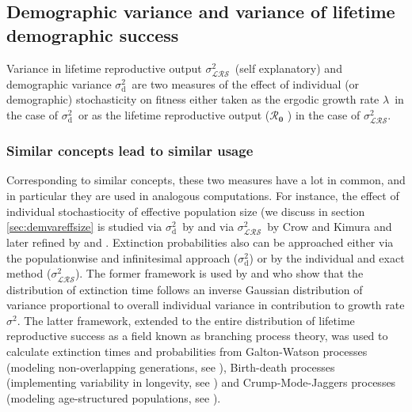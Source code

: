 \documentclass[10pt,a4paper]{article}
\newcommand{\lam}{$\lambda$}
\newcommand{\Rzero}{$\boldsymbol{\mathcal{R}_{0}}$  }
\newcommand{\vLRO}{$\sigma_{\mathrm{\mathcal{LRS}}}^2$}
\newcommand{\vd}{$\sigma_{\mathrm{d}}^2$}
\begin{document}
\subsection{Demographic variance and variance of lifetime demographic success}
\label{sec:demvarandLROvar}
\label{sec:Var_LRO and Var_d}

Variance in lifetime reproductive output \vLRO\ (self explanatory) and demographic variance \vd\ are two measures of the effect of individual (or demographic) stochasticity on fitness either taken as the ergodic growth rate \lam\ in the case of \vd\ or as the lifetime reproductive output (\Rzero) in the case of \vLRO.

\subsubsection*{Similar concepts lead to similar usage}
Corresponding to similar concepts, these two measures have a lot in common, and in particular they are used in analogous computations. For instance, the effect of individual stochastiocity of effective population size (we discuss in section \ref{sec:demvareffsize} is studied via \vd\ by \citep{Engen2005} and via \vLRO\ by Crow and Kimura \citep[see equation 7.6.2.17 page 351 of][]{Crow1970} and later refined by \citet{Rockwell1995} and \citet{Hill1979}.
Extinction probabilities also can be approached either via the populationwise and infinitesimal approach (\vd) or by the individual and exact method (\vLRO). The former framework is used by \citet{Lande1988} and \citet{Tuljapurkar1982c} who show that the distribution of extinction time follows an inverse Gaussian distribution of variance proportional to overall individual variance in contribution to growth rate $\sigma^{2}$. 
The latter framework, extended to the entire distribution of lifetime reproductive success as a field known as branching process theory, was used to calculate extinction times and probabilities from 
 Galton-Watson processes (modeling non-overlapping generations, see \citep{Keyfitz2005,Ellison1994}),
 Birth-death processes (implementing variability in longevity, see \citep{Goodman1967a}) and  Crump-Mode-Jaggers processes (modeling age-structured populations, see \citep{Crump1968,Crump1969}).
\end{document}
